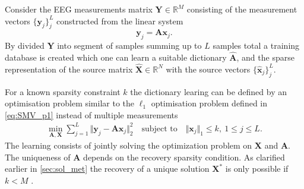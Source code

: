Consider the EEG measurements matrix $\mathbf{Y} \in \mathbb{R}^M$ consisting of the measurement vectors $\lbrace \mathbf{y}_j \rbrace_j^L$ constructed from the linear system
$$
\mathbf{y}_j = \mathbf{A} \mathbf{x}_j.
$$ 
By divided $\mathbf{Y}$ into segment of samples summing up to $L$ samples total a training database is created which one can learn a suitable dictionary $\hat{\mathbf{A}}$, and the sparse representation of the source matrix $\hat{\mathbf{X}} \in \mathbb{R}^N$ with the source vectors $\lbrace \hat{\mathbf{x}}_j \rbrace_j^L$.

For a known sparsity constraint $k$ the dictionary learing can be defined by an optimisation problem similar to the $\ell_1$ optimisation problem defined in \eqref{eq:SMV_p1} instead of multiple measurements \cite{Elad_book}
\begin{align}\label{eq:SVD1}
\min_{\mathbf{A}, \mathbf{X}} \sum_{j=1}^{L} \Vert \mathbf{y}_j - \mathbf{A} \mathbf{x}_j \Vert_2^2 \quad \text{subject to} \quad \Vert \textbf{x}_j \Vert_1 \leq k, \ 1 \leq j \leq L.
\end{align}  
The learning consists of jointly solving the optimization problem on $\mathbf{X}$ and $\mathbf{A}$. The uniqueness of $\mathbf{A}$ depends on the recovery sparsity condition. As clarified earlier in \ref{sec:sol_met} the recovery of a unique solution $\mathbf{X}^\ast$ is only possible if $k < M$ \cite{phd2015}.
    

